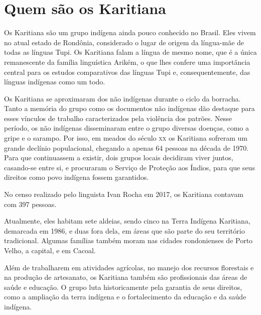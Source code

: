 \chapter{Quem são os Karitiana}

Os Karitiana são um grupo indígena ainda pouco conhecido no Brasil. Eles
vivem no atual estado de Rondônia, considerado o lugar de origem da
língua-mãe de todas as línguas Tupi. Os Karitiana falam a língua de
mesmo nome, que é a única remanescente da família linguística Arikém, o
que lhes confere uma importância central para os estudos comparativos
das línguas Tupi e, consequentemente, das línguas indígenas como um
todo.

Os Karitiana se aproximaram dos não indígenas durante o ciclo da
borracha. Tanto a memória do grupo como os documentos não indígenas dão
destaque para esses vínculos de trabalho caracterizados pela violência
dos patrões. Nesse período, os não indígenas disseminaram entre o grupo
diversas doenças, como a gripe e o sarampo. Por isso, em meados do
século \textsc{xx} os Karitiana sofreram um grande declínio populacional,
chegando a apenas 64 pessoas na década de 1970. Para que continuassem a
existir, dois grupos locais decidiram viver juntos, casando-se entre si,
e procuraram o Serviço de Proteção aos Índios, para que seus direitos
como povo indígena fossem garantidos.

No censo realizado pelo linguista Ivan Rocha em 2017, os Karitiana
contavam com 397 pessoas.

Atualmente, eles habitam sete aldeias, sendo cinco na Terra Indígena
Karitiana, demarcada em 1986, e duas fora dela, em áreas que são parte
do seu território tradicional. Algumas famílias também moram nas cidades
rondonienses de Porto Velho, a capital, e em Cacoal.

Além de trabalharem em atividades agrícolas, no manejo dos recursos
florestais e na produção de artesanato, os Karitiana também são
profissionais das áreas de saúde e educação. O grupo luta historicamente
pela garantia de seus direitos, como a ampliação da terra indígena e o
fortalecimento da educação e da saúde indígena.



